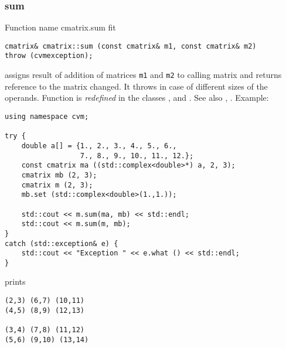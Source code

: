 \subsubsection{sum}
Function%
\pdfdest name {cmatrix.sum} fit
\begin{verbatim}
cmatrix& cmatrix::sum (const cmatrix& m1, const cmatrix& m2)
throw (cvmexception);
\end{verbatim}
assigns  result of addition of
matrices \verb"m1" and \verb"m2"  to  calling matrix
and returns  reference to
the matrix changed.
It throws  
in case of different sizes of the operands.
Function is \emph{redefined} in the classes
,  
and .
See also ,
.
Example:
\begin{Verbatim}
using namespace cvm;

try {
    double a[] = {1., 2., 3., 4., 5., 6.,
                  7., 8., 9., 10., 11., 12.};
    const cmatrix ma ((std::complex<double>*) a, 2, 3);
    cmatrix mb (2, 3);
    cmatrix m (2, 3);
    mb.set (std::complex<double>(1.,1.));

    std::cout << m.sum(ma, mb) << std::endl;
    std::cout << m.sum(m, mb);
}
catch (std::exception& e) {
    std::cout << "Exception " << e.what () << std::endl;
}
\end{Verbatim}
prints
\begin{Verbatim}
(2,3) (6,7) (10,11)
(4,5) (8,9) (12,13)

(3,4) (7,8) (11,12)
(5,6) (9,10) (13,14)
\end{Verbatim}
\newpage



